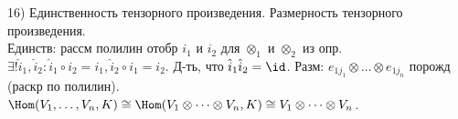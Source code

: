 16) Единственность тензорного произведения. Размерность тензорного произведения.\\
Единств: рассм полилин отобр $i_1$ и $i_2$ для $\otimes_1$ и $\otimes_2$ из опр. $\exists ! \hat{i}_1, \hat{i}_2 \colon \hat{i}_1 \circ i_2 = i_1, \hat{i}_2 \circ i_1 = i_2$. Д-ть, что $\hat{i}_1\hat{i}_2=\id$.
Разм: $e_{1j_1}\otimes\dots\otimes e_{1j_n}$ порожд (раскр по полилин). $\Hom(V_1,\dots,V_n, K) \cong \Hom(V_1\otimes \dots \otimes V_n,K) \cong V_1\otimes \dots \otimes V_n$.\\
